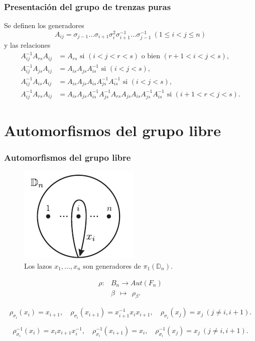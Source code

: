 \documentclass{beamer}
\theoremstyle{definition}
\newcommand{\D}{\mathbb{D}}
\begin{document}
\begin{frame}
\frametitle{Presentación del grupo de trenzas puras}
Se definen los generadores 
\[
A_{ij}=\sigma_{j-1}\dots\sigma_{i+1}\sigma_i^2\sigma_{i+1}^{-1}\dots\sigma_{j-1}^{-1}\ (1\leq i<j\leq n)
\]
y las relaciones
\begin{align*}
A_{ij}^{-1}A_{rs}A_{ij}&=A_{rs}\text{ si } (i<j<r<s)\text{ o bien } (r+1<i<j<s),\\
A_{ij}^{-1}A_{js}A_{ij}&=A_{is}A_{js}A_{is}^{-1} \text{ si } (i<j<s),\\
A_{ij}^{-1}A_{is}A_{ij}&=A_{is}A_{js}A_{is}A_{js}^{-1}A_{is}^{-1}\text{ si } (i<j<s),\\
A_{ij}^{-1}A_{rs}A_{ij}&=A_{is}A_{js}A_{is}^{-1}A_{js}^{-1}A_{rs}A_{js}A_{is}A_{js}^{-1}A_{is}^{-1}\text{ si } (i+1<r<j<s).
\end{align*}
\end{frame}

\section{Automorfismos del grupo libre}
\begin{frame}
\frametitle{Automorfismos del grupo libre}

\begin{figure}[h!]
\includegraphics[scale=0.7]{Imagenes/Disco.png}
\caption{Los lazos $x_1,\dots,x_n$ son generadores de $\pi_1(\D_n)$.}
\end{figure}
\end{frame}

\begin{frame}
\begin{align*}
\rho: & B_n \to Aut(F_n)\\
      & \beta\ \ \mapsto\ \ \rho_\beta.
\end{align*}

$$\rho_{\sigma_i}(x_i)=x_{i+1},\quad \rho_{\sigma_i}(x_{i+1})=x_{i+1}^{-1}x_ix_{i+1},\quad \rho_{\sigma_i}(x_j)=x_j\ (j\neq i,i+1).$$

$$\rho^{-1}_{\sigma_i}(x_i)=x_ix_{i+1}x_i^{-1},\quad \rho^{-1}_{\sigma_i}(x_{i+1})=x_i,\quad \rho^{-1}_{\sigma_i}(x_j)=x_j\ (j\neq i,i+1).$$
\end{frame}
\end{document}
